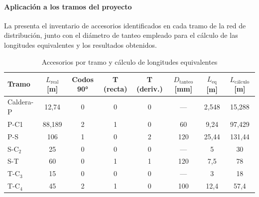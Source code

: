 \documentclass[12pt]{article}
\begin{document}
\paragraph{Aplicación a los tramos del proyecto}

La  presenta el inventario de accesorios identificados en cada tramo de la red de distribución, junto con el diámetro de tanteo empleado para el cálculo de las longitudes equivalentes y los resultados obtenidos.

\begin{table}[H]
	\centering
	\caption{Accesorios por tramo y cálculo de longitudes equivalentes}
	\label{tab:accesorios-por-tramo}
	\begin{tabular}{lccccccc}
		\toprule
		\textbf{Tramo} & \textbf{$L_{\text{real}}$ [m]} & \textbf{Codos 90°} & \textbf{T (recta)} & \textbf{T (deriv.)} & \textbf{$D_{\text{tanteo}}$ [mm]} & \textbf{$L_{\text{eq}}$ [m]} & \textbf{$L_{\text{cálculo}}$ [m]} \\
		\midrule
		Caldera-P      & 12,74                          & 0                  & 0                  & 0                   & ---                               & 2,548                        & 15,288                            \\
		P-C1        & 88,189                         & 2                  & 1                  & 0                   & 60                                & 9,24                         & 97,429                            \\
		P-S            & 106                            & 1                  & 0                  & 2                   & 120                               & 25,44                        & 131,44                            \\
		S-C$_2$        & 25                             & 0                  & 0                  & 0                   & ---                               & 5                            & 30                                \\
		S-T            & 60                             & 0                  & 1                  & 1                   & 120                               & 7,5                          & 78                                \\
		T-C$_3$        & 15                             & 0                  & 0                  & 0                   & ---                               & 3                            & 18                                \\
		T-C$_4$        & 45                             & 2                  & 1                  & 0                   & 100                               & 12,4                         & 57,4                              \\
		\bottomrule
	\end{tabular}
\end{table}
\end{document}

